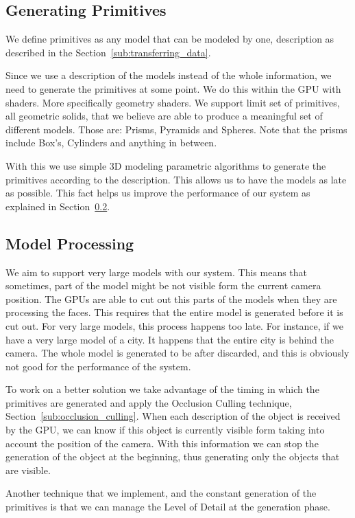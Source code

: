 
\subsection{Generating Primitives} %
\label{sub:generating_primitives}

We define primitives as any model that can be modeled by one, description as described in the Section~\ref{sub:transferring_data}.

Since we use a description of the models instead of the whole information, we need to generate the primitives at some point. We do this within the GPU with shaders. More specifically geometry shaders. We support limit set of primitives, all geometric solids, that we believe are able to produce a meaningful set of different models.
Those are: Prisms, Pyramids and Spheres. Note that the prisms include Box's, Cylinders and anything in between.

With this we use simple 3D modeling parametric algorithms to generate the primitives according to the description. This allows us to have the models as late as possible. This fact helps us improve the performance of our system as explained in Section~\ref{sub:size}.


\subsection{Model Processing} %
\label{sub:size}

We aim to support very large models with our system. This means that sometimes, part of the model might be not visible form the current camera position. The \glspl{GPU} are able to cut out this parts of the models when they are processing the faces. This requires that the entire model is generated before it is cut out. For very large models, this process happens too late. For instance, if we have a very large model of a city. It happens that the entire city is behind the camera. The whole model is generated to be after discarded, and this is obviously not good for the performance of the system.

To work on a better solution we take advantage of the timing in which the primitives are generated and apply the Occlusion Culling technique, Section~\ref{sub:occlusion_culling}. When each description of the object is received by the \gls{GPU}, we can know if this object is currently visible form taking into account the position of the camera. With this information we can stop the generation of the object at the beginning, thus generating only the objects that are visible.

Another technique that we implement, and the constant generation of the primitives is that we can manage the Level of Detail at the generation phase.





